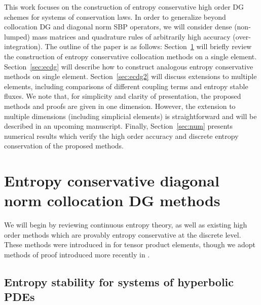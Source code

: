\documentclass[preprint,10pt]{article}
\theoremstyle{definition}
\theoremstyle{lemma}
\theoremstyle{theorem}
\theoremstyle{assumption}
\newcommand{\note}[1]{{\color{blue}{#1}}}
\begin{document}
This work focuses on the construction of entropy conservative high order DG schemes for systems of conservation laws.  In order to generalize beyond collocation DG and diagonal norm SBP operators, we will consider dense (non-lumped) mass matrices and quadrature rules of arbitrarily high accuracy (over-integration).  The outline of the paper is as follows: Section~\ref{sec:intro} will briefly review the construction of entropy conservative collocation methods on a single element.  Section~\ref{sec:ecdg} will describe how to construct analogous entropy conservative methods on single element.  Section~\ref{sec:ecdg2} will discuss extensions to multiple elements, including comparisons of different coupling terms and entropy stable fluxes.  We note that, for simplicity and clarity of presentation, the proposed methods and proofs are given in one dimension.  However, the extension to multiple dimensions (including simplicial elements) is straightforward and will be described in an upcoming manuscript.  
Finally, Section~\ref{sec:num} presents numerical results which verify the high order accuracy and discrete entropy conservation of the proposed methods.  




\section{Entropy conservative diagonal norm collocation DG methods}
\label{sec:intro}

We will begin by reviewing continuous entropy theory, as well as existing high order methods which are provably entropy conservative at the discrete level.  These methods were introduced in \cite{fisher2013high, carpenter2014entropy} for tensor product elements, though we adopt methods of proof introduced more recently in \cite{gassner2017br1, chen2017entropy}.  


\subsection{Entropy stability for systems of hyperbolic PDEs}
\end{document}
